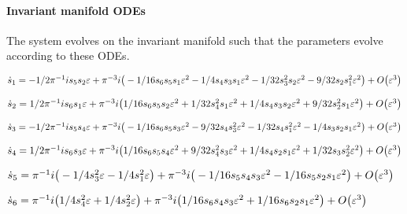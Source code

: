 \documentclass[11pt,a5paper]{article}
\begin{document}
\paragraph{Invariant manifold ODEs}
The system evolves on the invariant manifold such
that the parameters evolve according to these ODEs.
\(
\)\par
\(\dot s_{1}=-1/2 \pi ^{-1} i s_{5} s_{2} \varepsilon+\pi ^{-3} i \big(-1/16 s_{6
} s_{5} s_{1} \varepsilon^{2}-1/4 s_{4} s_{3} s_{1} \varepsilon^{2}-1/32 s_{3}^{2} s_{
2} \varepsilon^{2}-9/32 s_{2} s_{1}^{2} \varepsilon^{2}\big)+O\big(\varepsilon ^{3}
\big)
\)\par
\(\dot s_{2}=1/2 \pi ^{-1} i s_{6} s_{1} \varepsilon+\pi ^{-3} i \big(1/16 s_{6} 
s_{5} s_{2} \varepsilon^{2}+1/32 s_{4}^{2} s_{1} \varepsilon^{2}+1/4 s_{4} s_{3} s_{2}
 \varepsilon^{2}+9/32 s_{2}^{2} s_{1} \varepsilon^{2}\big)+O\big(\varepsilon ^{3}\big)
\)\par
\(\dot s_{3}=-1/2 \pi ^{-1} i s_{5} s_{4} \varepsilon+\pi ^{-3} i \big(-1/16 s_{6
} s_{5} s_{3} \varepsilon^{2}-9/32 s_{4} s_{3}^{2} \varepsilon^{2}-1/32 s_{4} s_{1}^{2
} \varepsilon^{2}-1/4 s_{3} s_{2} s_{1} \varepsilon^{2}\big)+O\big(\varepsilon ^{3}
\big)
\)\par
\(\dot s_{4}=1/2 \pi ^{-1} i s_{6} s_{3} \varepsilon+\pi ^{-3} i \big(1/16 s_{6} 
s_{5} s_{4} \varepsilon^{2}+9/32 s_{4}^{2} s_{3} \varepsilon^{2}+1/4 s_{4} s_{2} s_{1}
 \varepsilon^{2}+1/32 s_{3} s_{2}^{2} \varepsilon^{2}\big)+O\big(\varepsilon ^{3}\big)
\)\par
\(\dot s_{5}=\pi ^{-1} i \big(-1/4 s_{3}^{2} \varepsilon-1/4 s_{1}^{2} \varepsilon\big)+
\pi ^{-3} i \big(-1/16 s_{5} s_{4} s_{3} \varepsilon^{2}-1/16 s_{5} s_{2} s_{1}
 \varepsilon^{2}\big)+O\big(\varepsilon ^{3}\big)
\)\par
\(\dot s_{6}=\pi ^{-1} i \big(1/4 s_{4}^{2} \varepsilon+1/4 s_{2}^{2} \varepsilon\big)+
\pi ^{-3} i \big(1/16 s_{6} s_{4} s_{3} \varepsilon^{2}+1/16 s_{6} s_{2} s_{1} 
\varepsilon^{2}\big)+O\big(\varepsilon ^{3}\big)
\)\par
\(
\)\par
\end{document}
